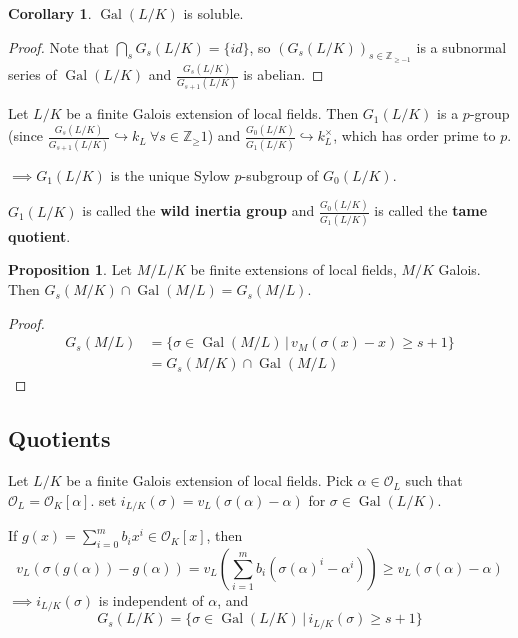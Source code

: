\documentclass[a4paper]{article}
\theoremstyle{definition}
\theoremstyle{default}
\newtheorem{prop}[definition]{Proposition}
\newtheorem{corollary}[definition]{Corollary}
\theoremstyle{remark}
\DeclareMathOperator{\Gal}{Gal}
\begin{document}
\begin{corollary}
	$\Gal(L/K)$ is soluble.
\end{corollary}
\begin{proof}
	Note that $\bigcap_s G_s(L/K) = \{id\}$,
	so $(G_s(L/K))_{s \in \mathbb{Z}_{\geq -1}}$ is a subnormal series of $\Gal(L/K)$
	and $\frac{G_s(L/K)}{G_{s+1}(L/K)}$ is abelian.
\end{proof}

Let $L/K$ be a finite Galois extension of local fields.
Then $G_1(L/K)$ is a $p$-group
(since $\frac{G_s(L/K)}{G_{s+1}(L/K)} \hookrightarrow k_L \ \forall s \in \mathbb{Z}_\geq 1$)
and $\frac{G_0(L/K)}{G_1(L/K)} \hookrightarrow k_L^\times$,
which has order prime to $p$.

$\implies G_1(L/K)$ is the unique Sylow $p$-subgroup of $G_0(L/K)$.

$G_1(L/K)$ is called the \textbf{wild inertia group}
and $\frac{G_0(L/K)}{G_1(L/K)}$ is called the \textbf{tame quotient}.

\begin{prop}
	Let $M/L/K$ be finite extensions of local fields, $M/K$ Galois.
	Then $G_s(M/K)\cap\Gal(M/L) = G_s(M/L)$.
\end{prop}
\begin{proof}
	\begin{align*}
		G_s(M/L) &= \{\sigma \in \Gal(M/L) \,|\, v_M(\sigma(x) - x) \geq s+1 \} \\
		&= G_s(M/K) \cap \Gal(M/L)
	\end{align*}
\end{proof}

\subsection{Quotients}
Let $L/K$ be a finite Galois extension of local fields.
Pick $\alpha \in \mathcal{O}_L$ such that $\mathcal{O}_L = \mathcal{O}_K[\alpha]$.
set $i_{L/K}(\sigma) = v_L(\sigma(\alpha) - \alpha)$ for $\sigma \in \Gal(L/K)$.

If $g(x) = \sum_{i=0}^m b_i x^i \in \mathcal{O}_K[x]$, then 
$$v_L(\sigma(g(\alpha)) - g(\alpha)) = v_L\left(\sum_{i=1}^{m}b_i(\sigma(\alpha)^i - \alpha^i)\right) \geq v_L(\sigma(\alpha) - \alpha)$$
$\implies i_{L/K}(\sigma)$ is independent of $\alpha$, and
$$G_s(L/K) = \{\sigma \in \Gal(L/K) \,|\, i_{L/K}(\sigma) \geq s+1 \}$$
\end{document}
